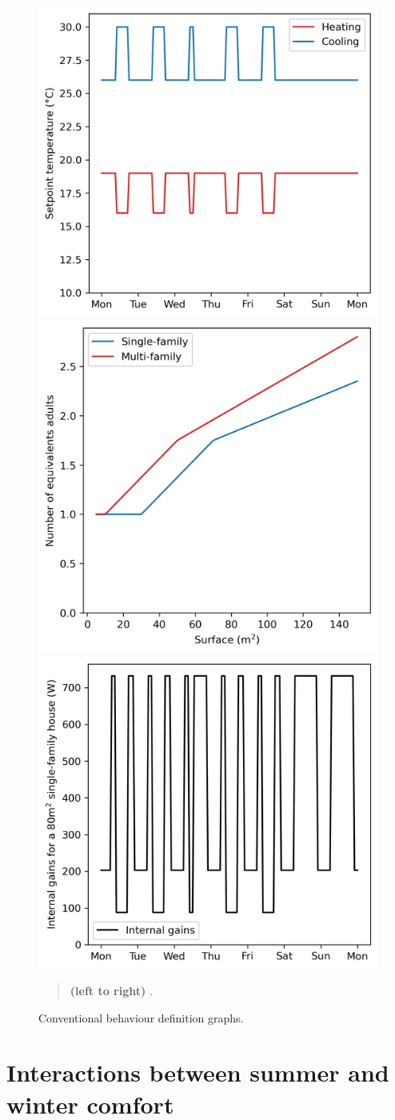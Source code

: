 \documentclass[11pt]{article}
\begin{document}
     \begin{figure}[ht]
            \centering
            \includegraphics[width=0.32\columnwidth]{figures/conventionnel_th-bce_2020_heating_cooling_rules.png}
            \includegraphics[width=0.32\columnwidth]{figures/conventionnel_th-bce_2020_nb_adulte_eq.png}
            \includegraphics[width=0.32\columnwidth]{figures/conventionnel_th-bce_2020_internal_gains_rules.png}
            \caption{\label{fig:behav} Conventional behaviour definition graphs.}
            \begin{quote}
                \vspace{-2mm}
                \small\noindent
                \textbf{(left to right)} . 
                
                 
              \end{quote}
        \end{figure}
    

\clearpage
\section{Interactions between summer and winter comfort}
\label{sec:inter}
\end{document}
